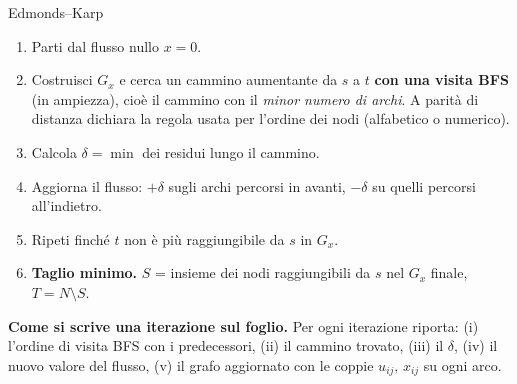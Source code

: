 \documentclass[11pt,a4paper]{article}
\begin{document}
\begin{ric}{Edmonds--Karp}
\begin{enumerate}
\item Parti dal flusso nullo $x = 0$.
\item Costruisci $G_x$ e cerca un cammino aumentante da $s$ a $t$ \textbf{con una visita BFS}
      (in ampiezza), cioè il cammino con il \emph{minor numero di archi}.
      A parità di distanza dichiara la regola usata per l'ordine dei nodi (alfabetico o numerico).
\item Calcola $\delta = \min$ dei residui lungo il cammino.
\item Aggiorna il flusso: $+\delta$ sugli archi percorsi in avanti, $-\delta$ su quelli percorsi
      all'indietro.
\item Ripeti finché $t$ non è più raggiungibile da $s$ in $G_x$.
\item \textbf{Taglio minimo.} $S$ = insieme dei nodi raggiungibili da $s$ nel $G_x$ finale,
      $T = N \setminus S$.
\end{enumerate}
\end{ric}

\begin{idea}
\textbf{Come si scrive una iterazione sul foglio.} Per ogni iterazione riporta:
(i) l'ordine di visita BFS con i predecessori, (ii) il cammino trovato, (iii) il $\delta$,
(iv) il nuovo valore del flusso, (v) il grafo aggiornato con le coppie
$u_{ij},\,x_{ij}$ su ogni arco.
\end{idea}
\end{document}

